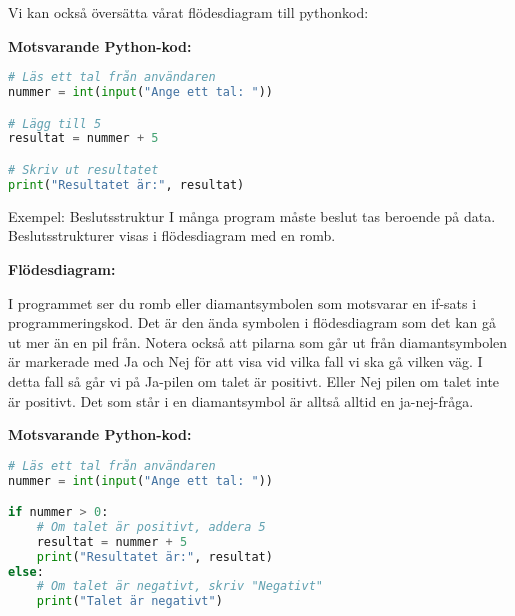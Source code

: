 Vi kan också översätta vårat flödesdiagram till pythonkod:

\textbf{Motsvarande Python-kod:}
\begin{lstlisting}[language=Python]
# Läs ett tal från användaren
nummer = int(input("Ange ett tal: "))

# Lägg till 5
resultat = nummer + 5

# Skriv ut resultatet
print("Resultatet är:", resultat)
\end{lstlisting}


Exempel: Beslutsstruktur
I många program måste beslut tas beroende på data. Beslutsstrukturer visas i flödesdiagram med en romb.

\textbf{Flödesdiagram:}
\begin{center}
\end{center}

I programmet ser du romb eller diamantsymbolen som motsvarar en if-sats i programmeringskod. 
Det är den ända symbolen i flödesdiagram som det kan gå ut mer än en pil från. 
Notera också att pilarna som går ut från diamantsymbolen är markerade med Ja och Nej för att visa
vid vilka fall vi ska gå vilken väg. 
I detta fall så går vi på Ja-pilen om talet är positivt. Eller Nej pilen om talet inte är positivt. 
Det som står i en diamantsymbol är alltså alltid en ja-nej-fråga. 

\textbf{Motsvarande Python-kod:}
\begin{lstlisting}[language=Python]
# Läs ett tal från användaren
nummer = int(input("Ange ett tal: "))

if nummer > 0:
    # Om talet är positivt, addera 5
    resultat = nummer + 5
    print("Resultatet är:", resultat)
else:
    # Om talet är negativt, skriv "Negativt"
    print("Talet är negativt")
\end{lstlisting}

